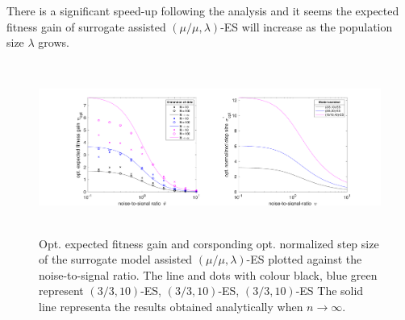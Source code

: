 There is a significant speed-up following the analysis and it seems the expected fitness gain of surrogate assisted $(\mu/\mu,\lambda)$-ES will increase as the population size $\lambda$ grows.




\begin{center}
\begin{figure}
\includegraphics[height=2.2in, width=6in]{opt_stepSize_fitGain_v1}
\caption{Opt. expected fitness gain and corsponding opt. normalized step size of the surrogate model assisted $(\mu/\mu,\lambda)$-ES plotted against the noise-to-signal ratio. The line and dots with colour black, blue green represent $(3/3,10)$-ES, $(3/3,10)$-ES, $(3/3,10)$-ES The solid line representa the results obtained analytically when $n\rightarrow \infty$. }
\label{fig:opt_stepSize_fitGain}
\end{figure}
\end{center}





